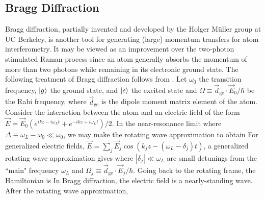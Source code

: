 \documentclass[reprint,
nofootinbib,
amsmath,amssymb,
aps]{revtex4-1}
\newcommand{\f}[2]{\frac{#1}{#2}}
\newcommand{\lp}{\left(}
\newcommand{\rp}{\right)}
\begin{document}
\subsection{Bragg Diffraction}\label{sect:BD}


Bragg diffraction, partially invented and developed by the Holger M\"{u}ller group at UC Berkeley, is another tool for generating (large) momentum transfers for atom interferometry. It may be viewed as an improvement over the two-photon stimulated Raman process since an atom generally absorbs the momentum of more than two photons while remaining in its electronic ground state.  The following treatment of Bragg diffraction follows from \cite{estey2016precision}. Let $\omega_0$ the transition frequency, $\ket{g}$  the ground state, and $\ket{e}$  the excited state and $\Omega \equiv \vec{d}_\text{ge}\cdot \vec{E}_0/\hbar$ be the Rabi frequency, where $\vec{d}_\text{ge}$ is the dipole moment matrix element of the atom. Consider the interaction between the atom and an electric field of the form $\vec{E} = \vec{E}_0(e^{ikz - i \omega_Lt} + e^{-ikz+i\omega_Lt}) /2 $.  In the near-resonance limit where $\Delta \equiv \omega_L - \omega_0 \ll \omega_0$, we may make the rotating wave approximation to obtain 
For generalized electric fields, $\vec{E} = \sum_j \vec{E}_j \cos(k_j z - (\omega_L - \delta_j)t)$, a generalized rotating wave approximation gives
where $|\delta_j|\ll \omega_L$ are small detunings from the ``main" frequency $\omega_L$ and $\Omega_j \equiv \vec{d}_\text{ge}\cdot \vec{E}_j / \hbar$. Going back to the rotating frame, the Hamiltonian is 
In Bragg diffraction, the electric field is a nearly-standing wave. After the rotating wave approximation, 
\end{document}
